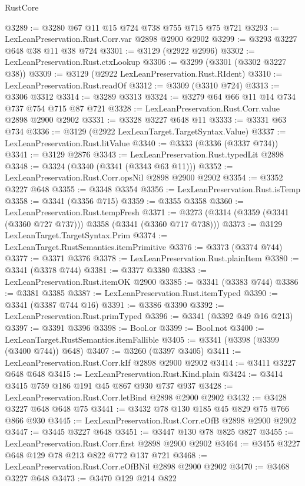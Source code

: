 \begin{lexlean}{RustCore}
\begin{coremodule}
@3289 := @3280 @67 @11 @15 @724 @738 @755 @715 @75 @721
@3293 := LexLeanPreservation.Rust.Corr.var @2898 @2900 @2902
@3299 := @3293 @3227 @648 @38 @11 @38 @724
@3301 := @3129 (@2922 @2996)
@3302 := LexLeanPreservation.Rust.ctxLookup
@3306 := @3299 (@3301 (@3302 @3227 @38))
@3309 := @3129 (@2922 LexLeanPreservation.Rust.RIdent)
@3310 := LexLeanPreservation.Rust.readOf
@3312 := @3309 (@3310 @724)
@3313 := @3306 @3312
@3314 := @3289 @3313
@3324 := @3279 @64 @66 @11 @14 @734 @737 @754 @715 @87 @721
@3328 := LexLeanPreservation.Rust.Corr.value @2898 @2900 @2902
@3331 := @3328 @3227 @648 @11
@3333 := @3331 @63 @734
@3336 := @3129 (@2922 LexLeanTarget.TargetSyntax.Value)
@3337 := LexLeanPreservation.Rust.litValue
@3340 := @3333 (@3336 (@3337 @734))
@3341 := @3129 @2876
@3343 := LexLeanPreservation.Rust.typedLit @2898
@3348 := @3324 (@3340 (@3341 (@3343 @63 @11)))
@3352 := LexLeanPreservation.Rust.Corr.opsNil @2898 @2900 @2902
@3354 := @3352 @3227 @648
@3355 := @3348 @3354
@3356 := LexLeanPreservation.Rust.isTemp
@3358 := @3341 (@3356 @715)
@3359 := @3355 @3358
@3360 := LexLeanPreservation.Rust.tempFresh
@3371 := @3273 (@3314 (@3359 (@3341 (@3360 @727 @737))) @3358 (@3341 (@3360 @717 @738)))
@3373 := @3129 LexLeanTarget.TargetSyntax.Prim
@3374 := LexLeanTarget.RustSemantics.itemPrimitive
@3376 := @3373 (@3374 @744)
@3377 := @3371 @3376
@3378 := LexLeanPreservation.Rust.plainItem
@3380 := @3341 (@3378 @744)
@3381 := @3377 @3380
@3383 := LexLeanPreservation.Rust.itemOK @2900
@3385 := @3341 (@3383 @744)
@3386 := @3381 @3385
@3387 := LexLeanPreservation.Rust.itemTyped
@3390 := @3341 (@3387 @744 @16)
@3391 := @3386 @3390
@3392 := LexLeanPreservation.Rust.primTyped
@3396 := @3341 (@3392 @49 @16 @213)
@3397 := @3391 @3396
@3398 := Bool.or
@3399 := Bool.not
@3400 := LexLeanTarget.RustSemantics.itemFallible
@3405 := @3341 (@3398 (@3399 (@3400 @744)) @648)
@3407 := @3260 (@3397 @3405)
@3411 := LexLeanPreservation.Rust.Corr.kIf @2898 @2900 @2902
@3414 := @3411 @3227 @648 @648
@3415 := LexLeanPreservation.Rust.Kind.plain
@3424 := @3414 @3415 @759 @186 @191 @45 @867 @930 @737 @937
@3428 := LexLeanPreservation.Rust.Corr.letBind @2898 @2900 @2902
@3432 := @3428 @3227 @648 @648 @75
@3441 := @3432 @78 @130 @185 @45 @829 @75 @766 @866 @930
@3445 := LexLeanPreservation.Rust.Corr.eOfB @2898 @2900 @2902
@3447 := @3445 @3227 @648
@3451 := @3447 @130 @78 @825 @827
@3455 := LexLeanPreservation.Rust.Corr.first @2898 @2900 @2902
@3464 := @3455 @3227 @648 @129 @78 @213 @822 @772 @137 @721
@3468 := LexLeanPreservation.Rust.Corr.eOfBNil @2898 @2900 @2902
@3470 := @3468 @3227 @648
@3473 := @3470 @129 @214 @822

\end{coremodule}
\end{lexlean}
